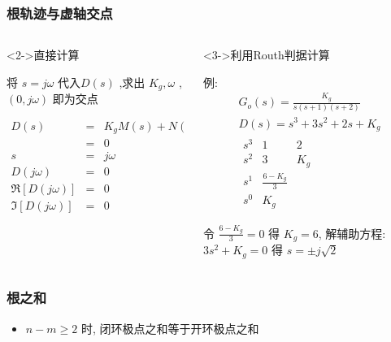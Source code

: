 \documentclass{beamer}
\begin{document}
\begin{frame}
\frametitle{根轨迹与虚轴交点}
\label{sec-1-12}
\begin{columns}
\begin{column}{0.5\textwidth}
\begin{block}<2->{直接计算}
\label{sec-1-12-1}

将 $s=j\omega$ 代入$D(s)$ ,求出 $K_g,\omega$ , $(0,j\omega)$ 即为交点

\begin{eqnarray*}
D(s) &= &K_gM(s)+N(s) \\
 &=& 0 \\
s &=& j\omega \\
D(j\omega) &=& 0 \\
\Re[D(j\omega)] &=& 0\\
\Im[D(j\omega)] &=& 0
\end{eqnarray*}
\end{block}
\end{column}
\begin{column}{0.5\textwidth}
\begin{block}<3->{利用Routh判据计算}
\label{sec-1-12-2}


例:
\begin{gather*}
G_o(s)  =  \frac{K_g}{s(s+1)(s+2)} \\
D(s)  = s^3+3s^2+2s+K_g \\
\begin{matrix}
s^3  &  1 &  2 \\
s^2  &  3  &  K_g \\
s^1  & \frac{6-K_g}{3} \\
s^0  & K_g
\end{matrix}
\end{gather*}

令 $\frac{6-K_g}{3}=0$ 得 $K_g=6$, 解辅助方程: $3s^2+K_g=0$ 得 $s=\pm j\sqrt{2}$
\end{block}
\end{column}
\end{columns}
\end{frame}
\begin{frame}
\frametitle{根之和}
\label{sec-1-13}

\begin{itemize}
\item <2-> $n-m\geq 2$ 时, 闭环极点之和等于开环极点之和
\end{itemize}
\end{frame}
\end{document}
